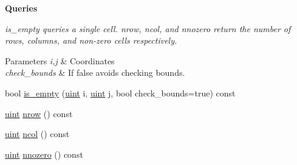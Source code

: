 \begin{Indent}\textbf{ Queries}\par
{\em {\ttfamily is\+\_\+empty} queries a single cell. {\ttfamily nrow}, {\ttfamily ncol}, and {\ttfamily nnozero} return the number of rows, columns, and non-\/zero cells respectively. 
\begin{DoxyParams}{Parameters}
{\em i,j} & Coordinates \\
\hline
{\em check\+\_\+bounds} & If {\ttfamily false} avoids checking bounds. \\
\hline
\end{DoxyParams}
}\begin{DoxyCompactItemize}
\item 
bool \hyperlink{class_b_array_a37ed3962c0ee5030b23cb6cde23a5cdf}{is\+\_\+empty} (\hyperlink{typedefs_8hpp_a91ad9478d81a7aaf2593e8d9c3d06a14}{uint} i, \hyperlink{typedefs_8hpp_a91ad9478d81a7aaf2593e8d9c3d06a14}{uint} j, bool check\+\_\+bounds=true) const
\item 
\hyperlink{typedefs_8hpp_a91ad9478d81a7aaf2593e8d9c3d06a14}{uint} \hyperlink{class_b_array_ac829edf4a9921bd6b3f56afbcbb2f37f}{nrow} () const
\item 
\hyperlink{typedefs_8hpp_a91ad9478d81a7aaf2593e8d9c3d06a14}{uint} \hyperlink{class_b_array_ac669bd57e3cbf4c60bf2b4a459dcdc4f}{ncol} () const
\item 
\hyperlink{typedefs_8hpp_a91ad9478d81a7aaf2593e8d9c3d06a14}{uint} \hyperlink{class_b_array_a9910b6f42e37d3b0a12cafb70b78775f}{nnozero} () const
\end{DoxyCompactItemize}
\end{Indent}
